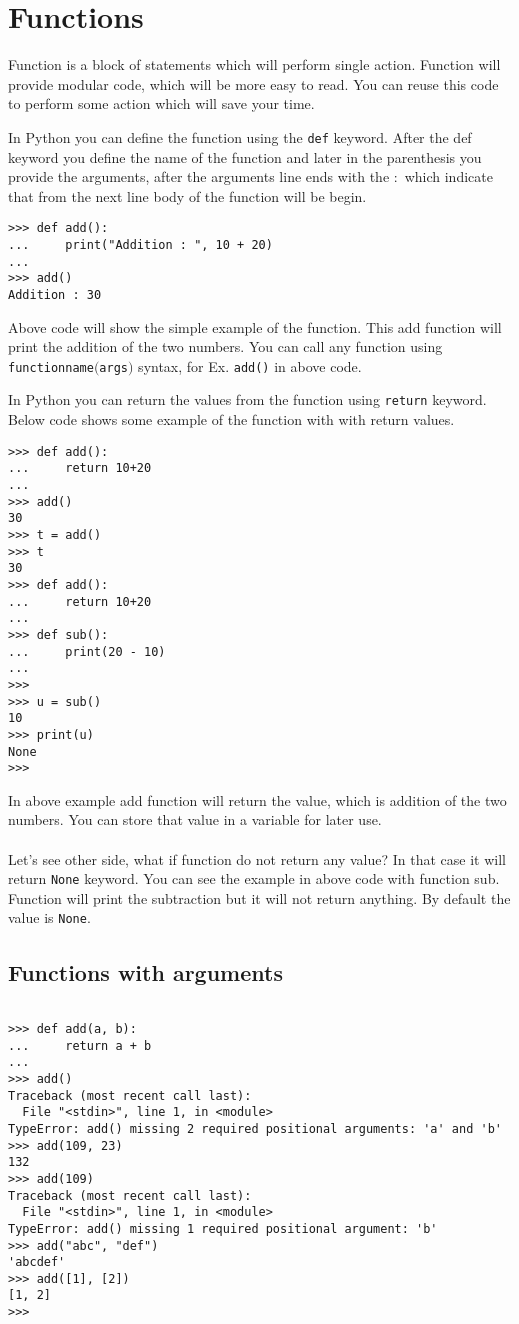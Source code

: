 \documentclass[letterpaper,12pt]{book}
\begin{document}
\section{Functions}
Function is a block of statements which will perform single action. Function will provide modular code, which will be more easy to read. You can reuse this code to perform some action which will save your time.

In Python you can define the function using the \texttt{def} keyword. 
After the def keyword you define the name of the function and later in the parenthesis you provide the arguments, after the arguments line ends with the \texttt{$:$} which indicate that from the next line body of the function will be begin.
\begin{verbatim}
>>> def add():
...     print("Addition : ", 10 + 20)
... 
>>> add()
Addition : 30
\end{verbatim}
Above code will show the simple example of the function. This add function will print the addition of the two numbers. You can call any function using \texttt{function\textunderscore name$($args$)$} syntax, for Ex. \texttt{add()} in above code.

In Python you can return the values from the function using \texttt{return} keyword. Below code shows some example of the function with with return values.
\begin{verbatim}
>>> def add():
...     return 10+20
... 
>>> add()
30
>>> t = add()
>>> t
30
>>> def add():
...     return 10+20
... 
>>> def sub():
...     print(20 - 10)
... 
>>> 
>>> u = sub()
10
>>> print(u)
None
>>> 
\end{verbatim}
In above example add function will return the value, which is addition of the two numbers. You can store that value in a variable for later use. 
\paragraph{}
Let's see other side, what if function do not return any value? In that case it will return \texttt{None} keyword. You can see the example in above code with function sub. Function will print the subtraction but it will not return anything. By default the value is \texttt{None}.
\subsection{Functions with arguments}

\begin{verbatim}

>>> def add(a, b):
...     return a + b
... 
>>> add()
Traceback (most recent call last):
  File "<stdin>", line 1, in <module>
TypeError: add() missing 2 required positional arguments: 'a' and 'b'
>>> add(109, 23)
132
>>> add(109)
Traceback (most recent call last):
  File "<stdin>", line 1, in <module>
TypeError: add() missing 1 required positional argument: 'b'
>>> add("abc", "def")
'abcdef'
>>> add([1], [2])
[1, 2]
>>> 
\end{verbatim}
\end{document}

